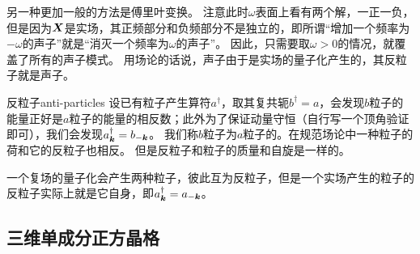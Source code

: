 另一种更加一般的方法是傅里叶变换。%
注意此时$\omega$表面上看有两个解，一正一负，但是因为$\vb*{X}$是实场，其正频部分和负频部分不是独立的，即所谓“增加一个频率为$-\omega$的声子”就是“消灭一个频率为$\omega$的声子”。
因此，只需要取$\omega > 0$的情况，就覆盖了所有的声子模式。
用场论的话说，声子由于是实场的量子化产生的，其反粒子就是声子。

\begin{back}{反粒子}{anti-particles}
    设已有粒子产生算符$a^\dagger$，取其复共轭$b^\dagger = a$，会发现$b$粒子的能量正好是$a$粒子的能量的相反数；此外为了保证动量守恒（自行写一个顶角验证即可），我们会发现$a^\dagger_{\vb*{k}} = b_{- \vb*{k}}$。
    我们称$b$粒子为$a$粒子的。在规范场论中一种粒子的荷和它的反粒子也相反。
    但是反粒子和粒子的质量和自旋是一样的。

    一个复场的量子化会产生两种粒子，彼此互为反粒子，但是一个实场产生的粒子的反粒子实际上就是它自身，即$a^\dagger_{\vb*{k}} = a_{- \vb*{k}}$。
\end{back}

\subsection{三维单成分正方晶格}

